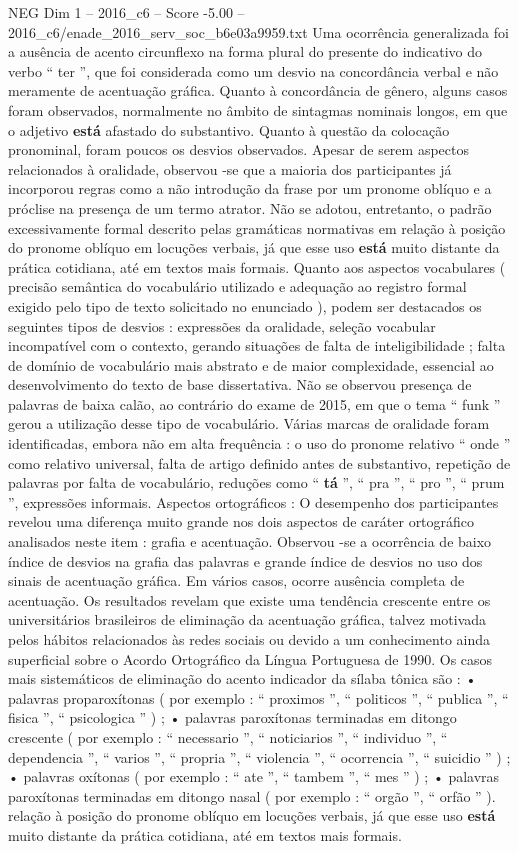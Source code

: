 \begin{textsample}{NEG Dim 1 – 2016\_c6 – Score -5.00 – 2016\_c6/enade\_2016\_serv\_soc\_b6e03a9959.txt}
Uma ocorrência generalizada foi a ausência de acento circunflexo na forma plural do presente do indicativo do verbo “ ter ”, que foi considerada como um desvio na concordância verbal e não meramente de acentuação gráfica.
Quanto à concordância de gênero, alguns casos foram observados, normalmente no âmbito de sintagmas nominais longos, em que o adjetivo \textbf{está} afastado do substantivo.
Quanto à questão da colocação pronominal, foram poucos os desvios observados.
Apesar de serem aspectos relacionados à oralidade, observou -se que a maioria dos participantes já incorporou regras como a não introdução da frase por um pronome oblíquo e a próclise na presença de um termo atrator.
Não se adotou, entretanto, o padrão excessivamente formal descrito pelas gramáticas normativas em relação à posição do pronome oblíquo em locuções verbais, já que esse uso \textbf{está} muito distante da prática cotidiana, até em textos mais formais.
Quanto aos aspectos vocabulares ( precisão semântica do vocabulário utilizado e adequação ao registro formal exigido pelo tipo de texto solicitado no enunciado ), podem ser destacados os seguintes tipos de desvios : expressões da oralidade, seleção vocabular incompatível com o contexto, gerando situações de falta de inteligibilidade ; falta de domínio de vocabulário mais abstrato e de maior complexidade, essencial ao desenvolvimento do texto de base dissertativa.
Não se observou presença de palavras de baixa calão, ao contrário do exame de 2015, em que o tema “ funk ” gerou a utilização desse tipo de vocabulário.
Várias marcas de oralidade foram identificadas, embora não em alta frequência : o uso do pronome relativo “ onde ” como relativo universal, falta de artigo definido antes de substantivo, repetição de palavras por falta de vocabulário, reduções como “ \textbf{tá} ”, “ pra ”, “ pro ”, “ prum ”, expressões informais.
Aspectos ortográficos : O desempenho dos participantes revelou uma diferença muito grande nos dois aspectos de caráter ortográfico analisados neste item : grafia e acentuação.
Observou -se a ocorrência de baixo índice de desvios na grafia das palavras e grande índice de desvios no uso dos sinais de acentuação gráfica.
Em vários casos, ocorre ausência completa de acentuação.
Os resultados revelam que existe uma tendência crescente entre os universitários brasileiros de eliminação da acentuação gráfica, talvez motivada pelos hábitos relacionados às redes sociais ou devido a um conhecimento ainda superficial sobre o Acordo Ortográfico da Língua Portuguesa de 1990.
Os casos mais sistemáticos de eliminação do acento indicador da sílaba tônica são : • palavras proparoxítonas ( por exemplo : “ proximos ”, “ politicos ”, “ publica ”, “ fisica ”, “ psicologica ” ) ; • palavras paroxítonas terminadas em ditongo crescente ( por exemplo : “ necessario ”, “ noticiarios ”, “ individuo ”, “ dependencia ”, “ varios ”, “ propria ”, “ violencia ”, “ ocorrencia ”, “ suicidio ” ) ; • palavras oxítonas ( por exemplo : “ ate ”, “ tambem ”, “ mes ” ) ; • palavras paroxítonas terminadas em ditongo nasal ( por exemplo : “ orgão ”, “ orfão ” ). relação à posição do pronome oblíquo em locuções verbais, já que esse uso \textbf{está} muito distante da prática cotidiana, até em textos mais formais.

\end{textsample}
